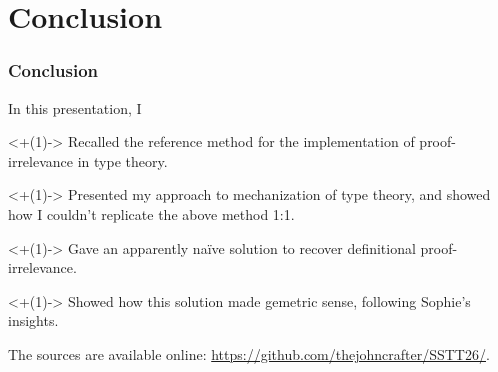 \section{Conclusion}

\begin{frame}
  \frametitle{Conclusion}

  \pause In this presentation, I
  \begin{tightitemize}
    \item<+(1)-> Recalled the reference method for the implementation of
      proof-irrelevance in type theory.
    \item<+(1)-> Presented my approach to mechanization of type theory,
      and showed how I couldn't replicate the above method 1:1.
    \item<+(1)-> Gave an apparently naïve solution to recover definitional
      proof-irrelevance.
    \item<+(1)-> Showed how this solution made gemetric sense, following
      Sophie's insights.
  \end{tightitemize}

  \pause The sources are available
  online: \url{https://github.com/thejohncrafter/SSTT26/}.
\end{frame}


